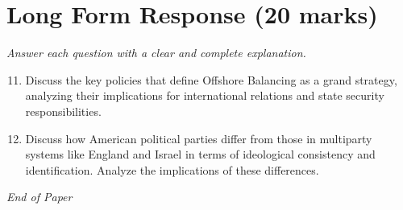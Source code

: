 \documentclass[12pt]{article}
\begin{document}
\section*{Long Form Response (20 marks)}
\textit{Answer each question with a clear and complete explanation.}
\begin{enumerate}[label=\arabic*.]
\setcounter{enumi}{10}
\item Discuss the key policies that define Offshore Balancing as a grand strategy, analyzing their implications for international relations and state security responsibilities.
\item Discuss how American political parties differ from those in multiparty systems like England and Israel in terms of ideological consistency and identification. Analyze the implications of these differences.
\end{enumerate}

\vfill
\noindent\textit{End of Paper}
\end{document}
